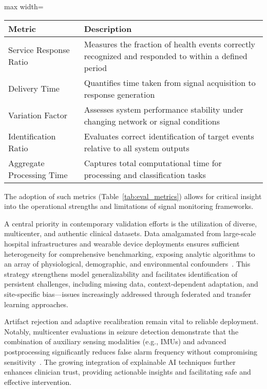 \begin{table*}[htbp]
\centering
\caption{Representative Metrics for Evaluating Real-Time Health Monitoring Systems}
\label{tab:eval_metrics}
\begin{adjustbox}{max width=\textwidth}
\begin{tabular}{ll}
\toprule
\textbf{Metric} & \textbf{Description} \\
\midrule
Service Response Ratio & Measures the fraction of health events correctly recognized and responded to within a defined period \\
Delivery Time & Quantifies time taken from signal acquisition to response generation \\
Variation Factor & Assesses system performance stability under changing network or signal conditions \\
Identification Ratio & Evaluates correct identification of target events relative to all system outputs \\
Aggregate Processing Time & Captures total computational time for processing and classification tasks \\
\bottomrule
\end{tabular}
\end{adjustbox}
\end{table*}

The adoption of such metrics (Table~\ref{tab:eval_metrics}) allows for critical insight into the operational strengths and limitations of signal monitoring frameworks.

A central priority in contemporary validation efforts is the utilization of diverse, multicenter, and authentic clinical datasets. Data amalgamated from large-scale hospital infrastructures and wearable device deployments ensures sufficient heterogeneity for comprehensive benchmarking, exposing analytic algorithms to an array of physiological, demographic, and environmental confounders~\cite{ref77,ref80,ref84,ref89,ref90,ref103,ref107}. This strategy strengthens model generalizability and facilitates identification of persistent challenges, including missing data, context-dependent adaptation, and site-specific bias—issues increasingly addressed through federated and transfer learning approaches.

Artifact rejection and adaptive recalibration remain vital to reliable deployment. Notably, multicenter evaluations in seizure detection demonstrate that the combination of auxiliary sensing modalities (e.g., IMUs) and advanced postprocessing significantly reduces false alarm frequency without compromising sensitivity~\cite{ref103}. The growing integration of explainable AI techniques further enhances clinician trust, providing actionable insights and facilitating safe and effective intervention.


